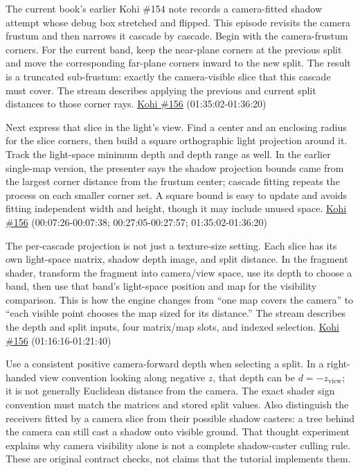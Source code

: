 The current book's earlier Kohi \#154 note records a camera-fitted shadow attempt whose debug box stretched and flipped. This episode revisits the camera frustum and then narrows it cascade by cascade. Begin with the camera-frustum corners. For the current band, keep the near-plane corners at the previous split and move the corresponding far-plane corners inward to the new split. The result is a truncated sub-frustum: exactly the camera-visible slice that this cascade must cover. The stream describes applying the previous and current split distances to those corner rays. \href{https://www.youtube.com/watch?v=coWS_saBPBk}{Kohi \#156} (01:35:02-01:36:20)

Next express that slice in the light's view. Find a center and an enclosing radius for the slice corners, then build a square orthographic light projection around it. Track the light-space minimum depth and depth range as well. In the earlier single-map version, the presenter says the shadow projection bounds came from the largest corner distance from the frustum center; cascade fitting repeats the process on each smaller corner set. A square bound is easy to update and avoids fitting independent width and height, though it may include unused space. \href{https://www.youtube.com/watch?v=coWS_saBPBk}{Kohi \#156} (00:07:26-00:07:38; 00:27:05-00:27:57; 01:35:02-01:36:20)

The per-cascade projection is not just a texture-size setting. Each slice has its own light-space matrix, shadow depth image, and split distance. In the fragment shader, transform the fragment into camera/view space, use its depth to choose a band, then use that band's light-space position and map for the visibility comparison. This is how the engine changes from ``one map covers the camera'' to ``each visible point chooses the map sized for its distance.'' The stream describes the depth and split inputs, four matrix/map slots, and indexed selection. \href{https://www.youtube.com/watch?v=coWS_saBPBk}{Kohi \#156} (01:16:16-01:21:40)

Use a consistent positive camera-forward depth when selecting a split. In a right-handed view convention looking along negative \(z\), that depth can be \(d=-z_{\mathrm{view}}\); it is not generally Euclidean distance from the camera. The exact shader sign convention must match the matrices and stored split values. Also distinguish the receivers fitted by a camera slice from their possible shadow casters: a tree behind the camera can still cast a shadow onto visible ground. That thought experiment explains why camera visibility alone is not a complete shadow-caster culling rule. These are original contract checks, not claims that the tutorial implements them.

